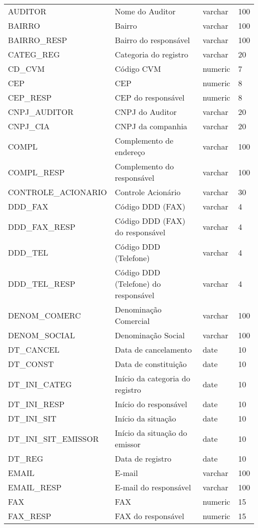 \documentclass[recuosum=1.5cm]{iftex2024}
\begin{document}
\begin{longtable}{p{5cm} p{5cm} p{2cm} p{2cm}}
	AUDITOR & Nome do Auditor & varchar & 100 \\
	BAIRRO & Bairro & varchar & 100 \\
	BAIRRO\_RESP & Bairro do responsável & varchar & 100 \\
	CATEG\_REG & Categoria do registro & varchar & 20 \\
	CD\_CVM & Código CVM & numeric & 7 \\
	CEP & CEP & numeric & 8 \\
	CEP\_RESP & CEP do responsável & numeric & 8 \\
	CNPJ\_AUDITOR & CNPJ do Auditor & varchar & 20 \\
	CNPJ\_CIA & CNPJ da companhia & varchar & 20 \\
	COMPL & Complemento de endereço & varchar & 100 \\
	COMPL\_RESP & Complemento do responsável & varchar & 100 \\
	CONTROLE\_ACIONARIO & Controle Acionário & varchar & 30 \\
	DDD\_FAX & Código DDD (FAX) & varchar & 4 \\
	DDD\_FAX\_RESP & Código DDD (FAX) do responsável & varchar & 4 \\
	DDD\_TEL & Código DDD (Telefone) & varchar & 4 \\
	DDD\_TEL\_RESP & Código DDD (Telefone) do responsável & varchar & 4 \\
	DENOM\_COMERC & Denominação Comercial & varchar & 100 \\
	DENOM\_SOCIAL & Denominação Social & varchar & 100 \\
	DT\_CANCEL & Data de cancelamento & date & 10 \\
	DT\_CONST & Data de constituição & date & 10 \\
	DT\_INI\_CATEG & Início da categoria do registro & date & 10 \\
	DT\_INI\_RESP & Início do responsável & date & 10 \\
	DT\_INI\_SIT & Início da situação & date & 10 \\
	DT\_INI\_SIT\_EMISSOR & Início da situação do emissor & date & 10 \\
	DT\_REG & Data de registro & date & 10 \\
	EMAIL & E-mail & varchar & 100 \\
	EMAIL\_RESP & E-mail do responsável & varchar & 100 \\
	FAX & FAX & numeric & 15 \\
	FAX\_RESP & FAX do responsável & numeric & 15 \\

\end{longtable}
\end{document}
